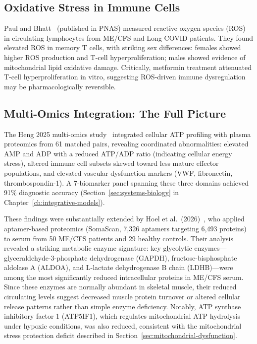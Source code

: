 \subsection{Oxidative Stress in Immune Cells}

Paul and Bhatt~\cite{PaulBhatt2025oxidative} (published in PNAS) measured reactive oxygen species (ROS) in circulating lymphocytes from ME/CFS and Long COVID patients. They found elevated ROS in memory T cells, with striking sex differences: females showed higher ROS production and T-cell hyperproliferation; males showed evidence of mitochondrial lipid oxidative damage. Critically, metformin treatment attenuated T-cell hyperproliferation in vitro, suggesting ROS-driven immune dysregulation may be pharmacologically reversible.

\subsection{Multi-Omics Integration: The Full Picture}

The Heng 2025 multi-omics study~\cite{heng2025mecfs} integrated cellular ATP profiling with plasma proteomics from 61 matched pairs, revealing coordinated abnormalities: elevated AMP and ADP with a reduced ATP/ADP ratio (indicating cellular energy stress), altered immune cell subsets skewed toward less mature effector populations, and elevated vascular dysfunction markers (VWF, fibronectin, thrombospondin-1). A 7-biomarker panel spanning these three domains achieved 91\% diagnostic accuracy (Section~\ref{sec:systems-biology} in Chapter~\ref{ch:integrative-models}).

These findings were substantially extended by Hoel et al.\ (2026)~\cite{Hoel2026proteome}, who applied aptamer-based proteomics (SomaScan, 7,326 aptamers targeting 6,493 proteins) to serum from 50 ME/CFS patients and 29 healthy controls. Their analysis revealed a striking metabolic enzyme signature: key glycolytic enzymes---glyceraldehyde-3-phosphate dehydrogenase (GAPDH), fructose-bisphosphate aldolase A (ALDOA), and L-lactate dehydrogenase B chain (LDHB)---were among the most significantly reduced intracellular proteins in ME/CFS serum. Since these enzymes are normally abundant in skeletal muscle, their reduced circulating levels suggest decreased muscle protein turnover or altered cellular release patterns rather than simple enzyme deficiency. Notably, ATP synthase inhibitory factor 1 (ATP5IF1), which regulates mitochondrial ATP hydrolysis under hypoxic conditions, was also reduced, consistent with the mitochondrial stress protection deficit described in Section~\ref{sec:mitochondrial-dysfunction}.

